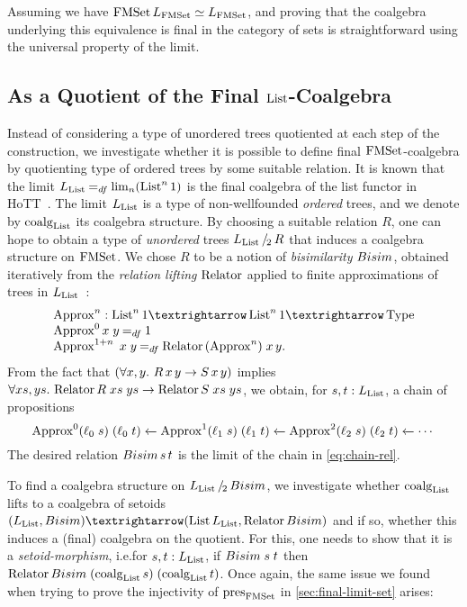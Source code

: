 \documentclass[final,a4paper,USenglish,cleveref]{lipics-v2021}
\begin{document}
Assuming \LLPO{} we have $\FMSet \Lim{\FMSet} \simeq \Lim{\FMSet}$, and proving that the coalgebra underlying this equivalence is final in the category of sets is straightforward using the universal property of the limit.

\subsection{As a Quotient of the Final \texorpdfstring{$\List$}{List}-Coalgebra}\label{sec:final-quotient-set}

Instead of considering a type of unordered trees quotiented at each step of the construction,
we investigate whether it is possible to define final
$\FMSet$-coalgebra by quotienting type of ordered trees by some suitable relation.
It is known that the limit $\Lim{\List} \DefEq \lim_n (\List^n 1)$ is the final coalgebra of the list functor in HoTT~\cite{Ahrens2015}.
The limit $\Lim{\List}$ is a type of non-wellfounded \emph{ordered} trees,
and we denote by $\coalg{\List}$ its coalgebra structure.
By choosing a suitable relation $R$, one can hope to obtain a type of
\emph{unordered} trees $\SetQuot[\Lim{\List}][R]$ that induces a coalgebra structure on $\FMSet$.
We chose $R$ to be a notion of \emph{bisimilarity} $\Bisim$,
obtained iteratively from the \emph{relation lifting} $\Relator$ applied to finite approximations of trees in $\Lim{\List}$~\cite{Hasuo2013}:
\[
\begin{array}{l}
  \Approx^n : \List^n 1 → \List^n 1 → \Type \\
  \Approx^0 x\;y \DefEq 1 \\
  \Approx^{1+n}\;x\;y \DefEq \Relator \,(\Approx^n)\;x\,y.
\end{array}
\]
From the fact that $(\forall x,y\mathpunct{.}\, R \,x\,y \to S \,x\,y)$ implies $\forall xs,ys \Where \Relator  R\;xs\;ys \to \Relator S\;xs\;ys$,
we obtain, for $s, t : \Lim{\List}$, a chain of propositions
\begin{equation}\label{eq:chain-rel}
  \Approx^0 (\ell_0\; s)\; (\ell_0\; t)
    \xleftarrow{} {\Approx^1 (\ell_1\; s)\; (\ell_1\; t)}
    \xleftarrow{} {\Approx^2 (\ell_2\; s)\; (\ell_2\; t)}
    \xleftarrow{} %
      \cdots
\end{equation}
The desired relation $\Bisim\,s\,t$ is the limit of the chain in \eqref{eq:chain-rel}.

To find a coalgebra structure on $\SetQuot[\Lim{\List}][\Bisim]$,
we investigate whether $\coalg{\List}$ lifts to a coalgebra of setoids $(\Lim{\List}, \Bisim) → (\List \Lim{\List}, \Relator \Bisim)$ and if so,
whether this induces a (final) coalgebra on the quotient.
For this, one needs to show that it is a \emph{setoid-morphism},
i.e.\@ for $s, t : \Lim{\List}$, if $\Bisim\;s\;t$
then $\Relator \Bisim\; (\coalg{\List} s)\; (\coalg{\List} t)$.
Once again, the same issue we found when trying to prove the injectivity of $\pres{\FMSet}$ in \cref{sec:final-limit-set} arises:
\end{document}
